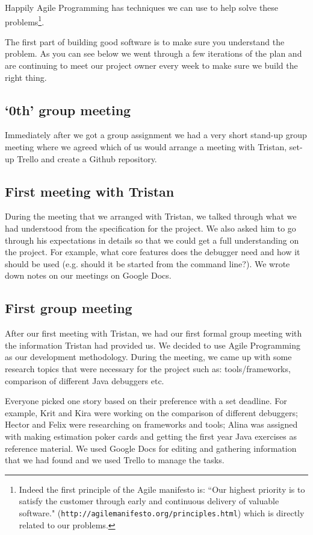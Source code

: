 \documentclass[11pt, a4paper]{article}
\begin{document}
Happily Agile Programming has techniques we can use to help solve these problems\footnote{Indeed the first principle of the Agile manifesto is: ``Our highest priority is to satisfy the customer
through early and continuous delivery of valuable software." ({\tt http://agilemanifesto.org/principles.html}) which is directly related to our problems.}.

The first part of building good software is to make sure you understand the problem.
As you can see below we went through a few iterations of the plan and are continuing to meet our project owner every week to make sure we build the right thing.

\subsection{`0th' group meeting}
Immediately after we got a group assignment we had a very short stand-up group meeting where we agreed which of us would arrange a meeting with Tristan, set-up Trello and create a Github repository.  

\subsection{First meeting with Tristan}
During the meeting that we arranged with Tristan, we talked through what we had understood from the specification for the project. We also asked him to go through his expectations in details so that we could get a full understanding on the project. For example, what core features does the debugger need and how it should be used (e.g. should it be started from the command line?). We wrote down notes on our meetings on Google Docs.

\subsection{First group meeting}
After our first meeting with Tristan, we had our first formal group meeting with the information Tristan had provided us. We decided to use Agile Programming as our development methodology. During the meeting, we came up with some research topics that were necessary for the project such as: tools/frameworks, comparison of different Java debuggers etc. 

Everyone picked one story based on their preference with a set deadline. For example, Krit and Kira were working on the comparison of different debuggers; Hector and Felix were researching on frameworks and tools; Alina was assigned with making estimation poker cards and getting the first year Java exercises as reference material. We used Google Docs for editing and gathering information that we had found and we used Trello to manage the tasks.
\end{document}
